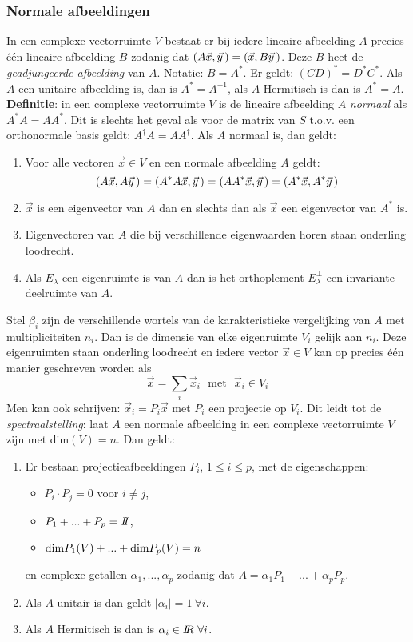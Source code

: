 \subsubsection{Normale afbeeldingen}
In een complexe vectorruimte $V$ bestaat er bij iedere lineaire afbeelding $A$
precies \'e\'en lineaire afbeelding $B$ zodanig dat $(A\vec{x},\vec{y}\,)=(\vec{x},B\vec{y}\,)$.
Deze $B$ heet de {\it geadjungeerde afbeelding} van $A$. Notatie: $B=A^*$. Er
geldt: $(CD)^*=D^*C^*$. Als $A$ een unitaire afbeelding is, dan is $A^*=A^{-1}$,
als $A$ Hermitisch is dan is $A^*=A$.
\npar
{\bf Definitie}: in een complexe vectorruimte $V$ is de lineaire afbeelding
$A$ {\it normaal} als $A^*A=AA^*$. Dit is slechts het geval als voor de matrix
van $S$ t.o.v. een orthonormale basis geldt: $A^\dagger A=AA^\dagger$.
\npar
Als $A$ normaal is, dan geldt:
\begin{enumerate}
\item Voor alle vectoren $\vec{x}\in V$ en een normale afbeelding $A$ geldt:
\[
(A\vec{x},A\vec{y}\,)=(A^*A\vec{x},\vec{y}\,)=(AA^*\vec{x},\vec{y}\,)=(A^*\vec{x},A^*\vec{y}\,)
\]
\item $\vec{x}$ is een eigenvector van $A$ dan en slechts dan als $\vec{x}$ een
      eigenvector van $A^*$ is.
\item Eigenvectoren van $A$ die bij verschillende eigenwaarden horen staan
      onderling loodrecht.
\item Als $E_\lambda$ een eigenruimte is van $A$ dan is het orthoplement
      $E_\lambda^\perp$ een invariante deelruimte van $A$.
\end{enumerate}
Stel $\beta_i$ zijn de verschillende wortels van de karakteristieke vergelijking van
$A$ met multipliciteiten $n_i$. Dan is de dimensie van elke eigenruimte $V_i$
gelijk aan $n_i$. Deze eigenruimten staan onderling loodrecht en iedere vector
$\vec{x}\in V$ kan op precies \'e\'en manier geschreven worden als
\[
\vec{x}=\sum_i\vec{x}_i~~~\mbox{met}~~~\vec{x}_i\in V_i
\]
Men kan ook schrijven: $\vec{x}_i=P_i\vec{x}$ met $P_i$ een projectie op $V_i$.
Dit leidt tot de {\it spectraalstelling}: laat $A$ een normale afbeelding in
een complexe vectorruimte $V$ zijn met dim$(V)=n$. Dan geldt:
\begin{enumerate}
\item Er bestaan projectieafbeeldingen $P_i$, $1\leq i\leq p$, met de
      eigenschappen:
      \begin{itemize}
      \item $P_i\cdot P_j=0$ voor $i\neq j$,
      \item $P_1+...+P_p=I\hspace{-1mm}I$,
      \item ${\rm dim}P_1(V)+...+{\rm dim}P_p(V)=n$
      \end{itemize}
      en complexe getallen $\alpha_1,...,\alpha_p$ zodanig dat
      $A=\alpha_1P_1+...+\alpha_pP_p$.
\item Als $A$ unitair is dan geldt $|\alpha_i|=1~\forall i$.
\item Als $A$ Hermitisch is dan is $\alpha_i\in I\hspace{-1mm}R~\forall i$.
\end{enumerate}

